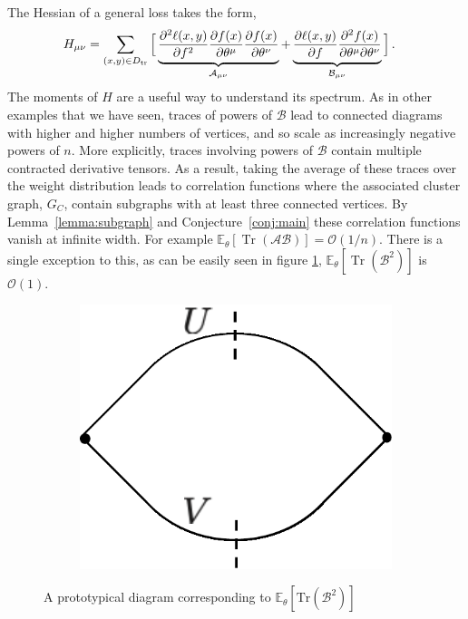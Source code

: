 \documentclass[english]{article}
\newcommand{\es}[2] {\begin{align} \label{#1} #2 \end{align}}
\DeclareMathOperator{\trace}{Tr}
\newcommand{\lexpp}[1]{\mathbb{E}_{#1}\left[}
\newcommand{\rexp}{\right]}
\begin{document}
The Hessian of a general loss takes the form,
\es{Hessian}{
H_{\mu\nu}&=\sum_{(x,y)\in D_{\rm tr}}\Big[\underbrace{\frac{\partial^{2}\ell(x,y)}{\partial f^{2}}\frac{\partial f(x)}{\partial\theta^{\mu}}\frac{\partial f(x)}{\partial\theta^{\nu}}}_{\mathcal{A}_{\mu\nu}}
+\underbrace{\frac{\partial\ell(x,y)}{\partial f}\frac{\partial^{2}f(x)}{\partial\theta^{\mu}\partial\theta^{\nu}}}_{\mathcal{B}_{\mu\nu}}\Big]\,.
}
The moments of $H$ are a useful way to understand its spectrum. As in other examples that we have seen, traces of powers of $\mathcal{B}$ lead to connected diagrams with higher and higher numbers of vertices, and so scale as increasingly negative powers of $n$. 
More explicitly, traces involving powers of $\mathcal{B}$ contain multiple contracted derivative tensors. 
As a result, taking the average of these traces over the weight distribution leads to correlation functions where the associated cluster graph, $G_C$, contain subgraphs with at least three connected vertices. By Lemma~\ref{lemma:subgraph} and Conjecture~\ref{conj:main} these correlation functions vanish at infinite width.
For example $\lexpp{\theta}\trace\left(\mathcal{A}\mathcal{B}\right)\rexp=\mathcal{O}(1/n)$.
There is a single exception to this, as can be easily seen in figure \ref{fig:d2f2_1hl}, $\lexpp{\theta}\trace(\mathcal{B}^{2})\rexp$ is $\mathcal{O}(1)$.
\begin{figure}
    \centering
    \begin{subfigure}[b]{0.2\textwidth}
        \includegraphics[width=\textwidth]{new_figs/B_2}
    \end{subfigure}
      \caption{A prototypical diagram corresponding to $\lexpp{\theta}\textrm{Tr}\left(\mathcal{B}^{2}\right)\rexp$}\label{fig:d2f2_1hl}
\end{figure}
\end{document}
